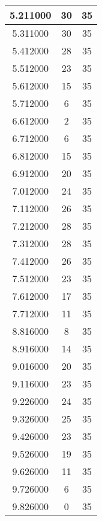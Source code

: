 \begin{longtable}[htbp]{|c|c|c|}
5.211000 & 30 & 35 \\ \hline
5.311000 & 30 & 35 \\ \hline
5.412000 & 28 & 35 \\ \hline
5.512000 & 23 & 35 \\ \hline
5.612000 & 15 & 35 \\ \hline
5.712000 & 6 & 35 \\ \hline
6.612000 & 2 & 35 \\ \hline
6.712000 & 6 & 35 \\ \hline
6.812000 & 15 & 35 \\ \hline
6.912000 & 20 & 35 \\ \hline
7.012000 & 24 & 35 \\ \hline
7.112000 & 26 & 35 \\ \hline
7.212000 & 28 & 35 \\ \hline
7.312000 & 28 & 35 \\ \hline
7.412000 & 26 & 35 \\ \hline
7.512000 & 23 & 35 \\ \hline
7.612000 & 17 & 35 \\ \hline
7.712000 & 11 & 35 \\ \hline
8.816000 & 8 & 35 \\ \hline
8.916000 & 14 & 35 \\ \hline
9.016000 & 20 & 35 \\ \hline
9.116000 & 23 & 35 \\ \hline
9.226000 & 24 & 35 \\ \hline
9.326000 & 25 & 35 \\ \hline
9.426000 & 23 & 35 \\ \hline
9.526000 & 19 & 35 \\ \hline
9.626000 & 11 & 35 \\ \hline
9.726000 & 6 & 35 \\ \hline
9.826000 & 0 & 35 \\ \hline
\end{longtable}
